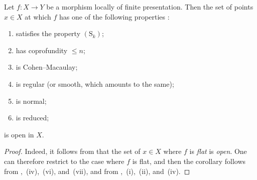 \begin{corollary}[12.1.7]
\label{IV.12.1.7}
Let $f:X\to Y$ be a morphism locally of finite presentation.
Then the set of points $x\in X$ at which $f$ has one of the following properties :
\begin{enumerate}[label=(\roman*)]
  \item satisfies the property $(\mathrm{S}_k)$;
  \item has coprofundity $\leqslant n$;
  \item is Cohen--Macaulay;
  \item is regular (or smooth, which amounts to the same);
  \item is normal;
  \item is reduced;
\end{enumerate}
is open in $X$.
\end{corollary}

\begin{proof}
Indeed, it follows from  that the set of $x\in X$ where $f$ is \emph{flat} is \emph{open}.
One can therefore restrict to the case where $f$ is flat, and then the corollary follows from ,~(iv),~(vi), and~(vii), and from ,~(i),~(ii), and~(iv).
\end{proof}

